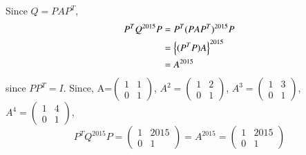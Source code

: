 Since   $Q = PAP^T$,
%
\begin{align}
P^TQ^{2015}P &= P^T(PAP^T)^{2015}P
\\
& = \left\{(P^TP)A\right\}^{2015}
\\
&=A^{2015}
\end{align}
since $PP^T = I$.
Since,
A=$\begin{pmatrix}
\displaystyle1&\displaystyle1\\
\displaystyle0&\displaystyle1
\end{pmatrix}$,
$A^2=\begin{pmatrix}
\displaystyle1&\displaystyle2\\
\displaystyle0&\displaystyle1
\end{pmatrix}$,
$A^3=\begin{pmatrix}
\displaystyle1&\displaystyle3\\
\displaystyle0&\displaystyle1
\end{pmatrix}$,
$A^4=\begin{pmatrix}
\displaystyle1&\displaystyle4\\
\displaystyle0&\displaystyle1
\end{pmatrix}$,
$$
P^TQ^{2015}P=\begin{pmatrix}
\displaystyle1&\displaystyle2015\\
\displaystyle0&\displaystyle1
\end{pmatrix}
=
A^{2015}=
\begin{pmatrix}
\displaystyle1&\displaystyle2015\\
\displaystyle0&\displaystyle1
\end{pmatrix}
$$
